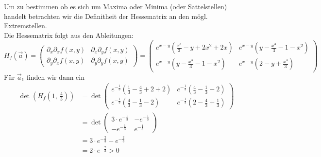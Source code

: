 \documentclass[10pt]{article}
\newcommand{\secondpage}{
	\newpage 
	\setlength{\headheight}{0cm}
}
\begin{document}
\secondpage

Um zu bestimmen ob es sich um Maxima oder Minima (oder Sattelstellen)
handelt betrachten wir die Definitheit der Hessematrix an den mögl. 
Extremstellen.\\
Die Hessematrix folgt aus den Ableitungen:
\[
	H_f(\vec a)
	= \begin{pmatrix}
		\partial_x\partial_x f(x,y) &
		\partial_x\partial_y f(x,y) \\
		\partial_y\partial_x f(x,y) &
		\partial_y\partial_y f(x,y)
	\end{pmatrix}
	= \begin{pmatrix}
	e^{x-y} \left(\frac{x^3}{3} - y + 2x^2 + 2x\right) &
	e^{x-y} \left( y - \frac{x^3}3 - 1 - x^2\right) \\
	e^{x-y} \left( y - \frac{x^3}3 - 1 - x^2\right) &
	e^{x-y} \left(2 -y + \frac{x^3}3 \right)
	\end{pmatrix}
\]
Für $\vec a_1$ finden wir dann ein 
\begin{align*}
	\det \left(H_f\left(1, \ \frac 43 \right) \right)
	&= \det
	\begin{pmatrix}
	e^{-\frac13} \left(\frac{1}{3} - \frac43 + 2 + 2\right) &
	e^{-\frac13} \left( \frac43 - \frac{1}3 - 2\right) \\
	e^{-\frac13} \left( \frac43 - \frac{1}3 - 2 \right) &
	e^{-\frac13} \left(2 - \frac43 + \frac{1}3 \right)
	\end{pmatrix} \\
	&= \det
	\begin{pmatrix}
	3 \cdot e^{-\frac13}&
	-e^{-\frac13} \\
	-e^{-\frac13} &
	e^{-\frac13}
	\end{pmatrix} \\
	&= 3 \cdot e^{-\frac{2}{3}} - e^{-\frac{2}{3}} \\
	&= 2 \cdot e^{-\frac23} > 0
\end{align*}
\end{document}
